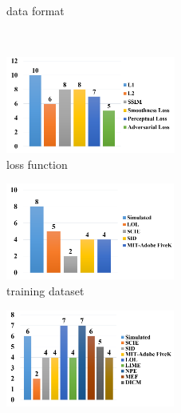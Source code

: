 \documentclass[letterpaper,12pt]{article}
\begin{document}
\begin{figure}[htbp]
\begin{subfigure}{0.2\textwidth}
			\caption{data format}
			\label{fig:subfig_d}
		\end{subfigure}\\
		\begin{subfigure}{0.2\textwidth}
			\includegraphics[width=\linewidth]{loss_function}
			\captionsetup{font=scriptsize}
			\caption{loss function}
			\label{fig:subfig_e}
		\end{subfigure}
		\begin{subfigure}{0.2\textwidth}
			\includegraphics[width=\linewidth]{training_dataset}
			\captionsetup{font=scriptsize}
			\caption{training dataset}
			\label{fig:subfig_f}	
		\end{subfigure}	
		\begin{subfigure}{0.2\textwidth}
			\includegraphics[width=\linewidth]{testing_dataset}

\end{subfigure}
\end{figure}
\end{document}
